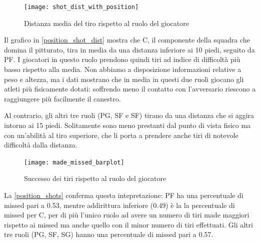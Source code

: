 \par

\begin{figure}
\caption{Distanza media del tiro rispetto al ruolo del giocatore}
\label{position_shot_dist}
\texttt{[image: shot\_dist\_with\_position]}
\end{figure}

Il grafico in \autoref{position_shot_dist} mostra che C, il componente della squadra che domina il pitturato, tira in media da una distanza inferiore ai 10 piedi, seguito da PF. I giocatori in questo ruolo prendono quindi tiri ad indice di difficoltà più basso rispetto alla media.
Non abbiamo a disposizione informazioni relative a peso e altezza, ma i dati \cite{basketball-reference} mostrano che in media in questi due ruoli giocano gli atleti più fisicamente dotati: soffrendo meno il contatto con l'avversario riescono a raggiungere più facilmente il canestro.

Al contrario, gli altri tre ruoli (PG, SF e SF) tirano da una distanza che si aggira intorno ai 15 piedi. Solitamente sono meno prestanti dal punto di vista fisico ma con un'abilità al tiro superiore, che li porta a prendere anche tiri di notevole difficoltà dalla distanza.

\begin{figure}
\caption{Successo dei tiri rispetto al ruolo del giocatore}
\label{position_shots}
\texttt{[image: made\_missed\_barplot]}
\end{figure}

La \autoref{position_shots} conferma questa intepretazione: PF ha una percentuale di missed pari a 0.53, mentre addirittura inferiore (0.49) è la la percentuale di missed per C, per di più l'unico ruolo ad avere un numero di tiri made maggiori rispetto ai missed ma anche quello con il minor numero di tiri effettuati.
Gli altri tre ruoli (PG, SF, SG) hanno una percentuale di missed pari a 0.57.